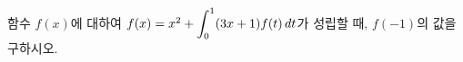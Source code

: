 함수 $f(x)$에 대하여 $f(x)=x^2+\displaystyle\int_{0}^{1} (3x+1)f(t)\mkern3mu dt$가 성립할 때, $f(-1)$의 값을 구하시오.

